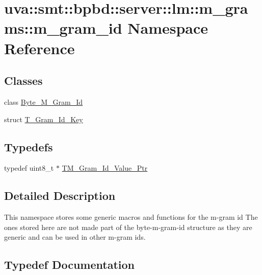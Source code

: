 \hypertarget{namespaceuva_1_1smt_1_1bpbd_1_1server_1_1lm_1_1m__grams_1_1m__gram__id}{}\section{uva\+:\+:smt\+:\+:bpbd\+:\+:server\+:\+:lm\+:\+:m\+\_\+grams\+:\+:m\+\_\+gram\+\_\+id Namespace Reference}
\label{namespaceuva_1_1smt_1_1bpbd_1_1server_1_1lm_1_1m__grams_1_1m__gram__id}
\subsection*{Classes}
\begin{DoxyCompactItemize}
\item 
class \hyperlink{classuva_1_1smt_1_1bpbd_1_1server_1_1lm_1_1m__grams_1_1m__gram__id_1_1_byte___m___gram___id}{Byte\+\_\+\+M\+\_\+\+Gram\+\_\+\+Id}
\item 
struct \hyperlink{structuva_1_1smt_1_1bpbd_1_1server_1_1lm_1_1m__grams_1_1m__gram__id_1_1_t___gram___id___key}{T\+\_\+\+Gram\+\_\+\+Id\+\_\+\+Key}
\end{DoxyCompactItemize}
\subsection*{Typedefs}
\begin{DoxyCompactItemize}
\item 
typedef uint8\+\_\+t $\ast$ \hyperlink{namespaceuva_1_1smt_1_1bpbd_1_1server_1_1lm_1_1m__grams_1_1m__gram__id_aa605051ded9336178d905e9581702378}{T\+M\+\_\+\+Gram\+\_\+\+Id\+\_\+\+Value\+\_\+\+Ptr}
\end{DoxyCompactItemize}


\subsection{Detailed Description}
This namespace stores some generic macros and functions for the m-\/gram id The ones stored here are not made part of the byte-\/m-\/gram-\/id structure as they are generic and can be used in other m-\/gram ids. 

\subsection{Typedef Documentation}
\hypertarget{namespaceuva_1_1smt_1_1bpbd_1_1server_1_1lm_1_1m__grams_1_1m__gram__id_aa605051ded9336178d905e9581702378}{}
